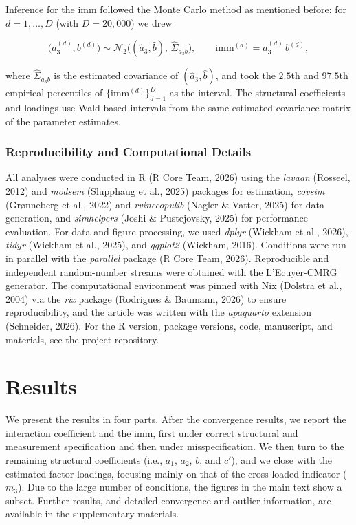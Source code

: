 \documentclass[
  man,
  longtable,
  nolmodern,
  notxfonts,
  notimes,
  colorlinks=true,linkcolor=blue,citecolor=blue,urlcolor=blue]{apa7}
\begin{document}
Inference for the imm followed the Monte Carlo method as mentioned
before: for \(d = 1, \dots, D\) (with \(D = 20{,}000\)) we drew

\[
\bigl(a_3^{(d)}, b^{(d)}\bigr) \sim
\mathcal{N}_2\!\bigl((\hat a_3, \hat b),\, \hat\Sigma_{a_3 b}\bigr),
\qquad
\mathrm{imm}^{(d)} = a_3^{(d)}\, b^{(d)},
\]

\noindent where \(\hat\Sigma_{a_3 b}\) is the estimated covariance of
\((\hat a_3, \hat b)\), and took the \(2.5\)th and \(97.5\)th empirical
percentiles of \(\{\mathrm{imm}^{(d)}\}_{d=1}^{D}\) as the interval. The
structural coefficients and loadings use Wald-based intervals from the
same estimated covariance matrix of the parameter estimates.

\subsubsection{Reproducibility and Computational
Details}\label{reproducibility-and-computational-details}

All analyses were conducted in R (R Core Team, 2026) using the
\emph{lavaan} (Rosseel, 2012) and \emph{modsem} (Slupphaug et al., 2025)
packages for estimation, \emph{covsim} (Grønneberg et al., 2022) and
\emph{rvinecopulib} (Nagler \& Vatter, 2025) for data generation, and
\emph{simhelpers} (Joshi \& Pustejovsky, 2025) for performance
evaluation. For data and figure processing, we used \emph{dplyr}
(Wickham et al., 2026), \emph{tidyr} (Wickham et al., 2025), and
\emph{ggplot2} (Wickham, 2016). Conditions were run in parallel with the
\emph{parallel} package (R Core Team, 2026). Reproducible and
independent random-number streams were obtained with the L'Ecuyer-CMRG
generator. The computational environment was pinned with Nix (Dolstra et
al., 2004) via the \emph{rix} package (Rodrigues \& Baumann, 2026) to
ensure reproducibility, and the article was written with the
\emph{apaquarto} extension (Schneider, 2026). For the R version, package
versions, code, manuscript, and materials, see the project repository.

\section{Results}\label{results}

We present the results in four parts. After the convergence results, we
report the interaction coefficient and the imm, first under correct
structural and measurement specification and then under
misspecification. We then turn to the remaining structural coefficients
(i.e., \(a_1\), \(a_2\), \(b\), and \(c'\)), and we close with the
estimated factor loadings, focusing mainly on that of the cross-loaded
indicator (\(m_3\)). Due to the large number of conditions, the figures
in the main text show a subset. Further results, and detailed
convergence and outlier information, are available in the supplementary
materials.
\end{document}
